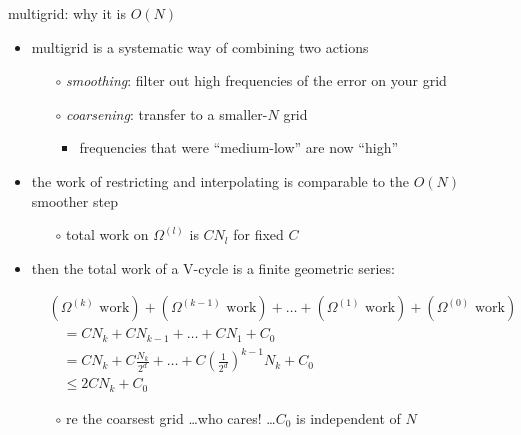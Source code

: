 \documentclass[hide notes,intlimits,usenames,dvipsnames]{beamer}
\begin{document}
\begin{frame}{multigrid: why it is $O(N)$}

\begin{itemize}
\item multigrid is a systematic way of combining two actions
	\begin{itemize}
	\item[$\circ$] \emph{smoothing}: filter out high frequencies of the error on your grid
	\item[$\circ$] \emph{coarsening}: transfer to a smaller-$N$ grid
    	\begin{itemize}
	    \item frequencies that were ``medium-low'' are now ``high''
    	\end{itemize}
	\end{itemize}
\item the work of restricting and interpolating is comparable to the $O(N)$ smoother step
	\begin{itemize}
	\item[$\circ$] total work on $\Omega^{(l)}$ is $C N_l$ for fixed $C$
	\end{itemize}
\item then the total work of a V-cycle is a finite geometric series:

\vspace{-3mm}
\small
\begin{align*}
&(\Omega^{(k)} \text{ work}) + (\Omega^{(k-1)} \text{ work}) + \dots + (\Omega^{(1)} \text{ work}) + (\Omega^{(0)} \text{ work}) \\
&\quad = C N_k + C N_{k-1} + \dots + C N_1 + C_0 \\
&\quad = C N_k + C \frac{N_k}{2^d}  + \dots + C \left(\frac{1}{2^d}\right)^{k-1} N_k + C_0 \\
&\quad \le 2 C N_k + C_0
\end{align*}

    \vspace{-2mm}
	\begin{itemize}
	\item[$\circ$] re the coarsest grid \dots who cares! \dots $C_0$ is independent of $N$
	\end{itemize}

\end{itemize}
\end{frame}

\newcommand{\niceprob}{V-cycle-preconditioned CG iterations on $\Omega=[0,1]^d$ Poisson}
\newcommand{\niceprobtwo}{V-cycle-preconditioned CG iterations on $\Omega=[0,1]^2$ Poisson}
\end{document}
